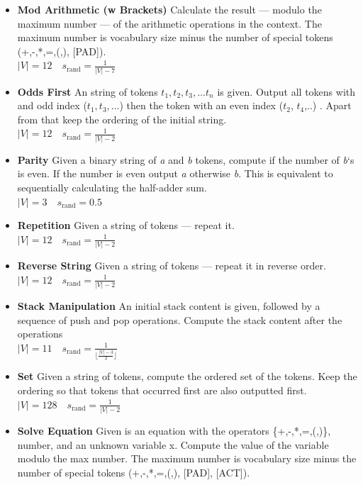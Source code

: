 \documentclass[dvipsnames]{article}
\begin{document}
\begin{appendix}
\begin{itemize}
    Calculate the result --- modulo the max number --- of the arithmetic operations in the context. The maximum number is the vocabulary size minus the number of special tokens (+,-,*,=, [PAD]). \\
    $|V|=10 \quad s_{\text{rand}}=\frac{1}{|V|-5}$
    \item\textbf{Mod Arithmetic (w Brackets)}
    Calculate the result --- modulo the maximum number --- of the arithmetic operations in the context. The maximum number is vocabulary size minus the number of special tokens (+,-,*,=,(,), [PAD]). \\
    $|V|=12 \quad s_{\text{rand}}=\frac{1}{|V|-7}$
    \item\textbf{Odds First}
    An string of tokens $t_1, t_2, t_3, ...t_n$ is given. Output all tokens with and odd index ($t_1,t_3,...$) then the token with an even index ($t_2$, $t_4$,..) . Apart from that keep the ordering of the initial string. \\
    $|V|=12 \quad s_{\text{rand}}=\frac{1}{|V| - 2}$
    \item\textbf{Parity}
    Given a binary string of \textit{a} and \textit{b} tokens, compute if the number of \textit{b}`s is even. If the number is even output \textit{a} otherwise \textit{b}. This is equivalent to sequentially calculating the half-adder sum. \\
    $|V|=3 \quad s_{\text{rand}}=0.5$
    \item\textbf{Repetition}
    Given a string of tokens --- repeat it. \\
    $|V|=12 \quad s_{\text{rand}}=\frac{1}{|V| - 2}$
    \item\textbf{Reverse String}
    Given a string of tokens --- repeat it in reverse order. \\
    $|V|=12 \quad s_{\text{rand}}=\frac{1}{|V| - 2}$
    \item\textbf{Stack Manipulation}
    An initial stack content is given, followed by a sequence of push and pop operations. Compute the stack content after the operations \\
    $|V|=11 \quad s_{\text{rand}}=\frac{1}{\lfloor\frac{|V| - 3}{2}\rfloor}$
    \item\textbf{Set}
    Given a string of tokens, compute the ordered set of the tokens. Keep the ordering so that tokens that occurred first are also outputted first. \\
    $|V|=128 \quad s_{\text{rand}}=\frac{1}{|V| - 2}$
    \item\textbf{Solve Equation}
    Given is an equation with the operators \{+,-,*,=,(,)\}, number, and an unknown variable x. Compute the value of the variable modulo the max number. The maximum number is vocabulary size minus the number of special tokens (+,-,*,=,(,), [PAD], [ACT]). \\

\end{itemize}
\end{appendix}
\end{document}
